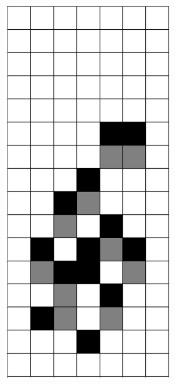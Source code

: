 \documentclass[12pt]{article}
\numberwithin{figure}{section} %
\begin{document}
\begin{figure}[H]
       \begin{subfigure}{0.19\textwidth}
     \centering
     \includegraphics[width=\linewidth]{Section4/19.0}

\end{subfigure}
\end{figure}
\end{document}
